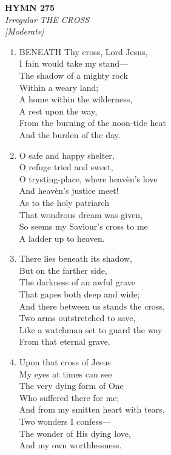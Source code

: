 \newpage
\begin{center}
    {\Large \textbf{HYMN 275}}
    \\
    \textit{Irregular THE CROSS}
    \\
    \textit{\small [Moderate]}
\end{center}
\vspace{1em}

\begin{enumerate}
    \item BENEATH Thy cross, Lord Jesus, \\
        I fain would take my stand--- \\
        The shadow of a mighty rock \\
        Within a weary land; \\
        A home within the wilderness, \\
        A rest upon the way, \\
        From the burning of the noon-tide heat \\
        And the burden of the day.

    \item O safe and happy shelter, \\
        O refuge tried and sweet, \\
        O trysting-place, where heav\`en's love \\
        And heav\`en's justice meet! \\
        As to the holy patriarch \\
        That wondrous dream was given, \\
        So seems my Saviour's cross to me \\
        A ladder up to heaven.

    \item There lies beneath its shadow, \\
        But on the farther side, \\
        The darkness of an awful grave \\
        That gapes both deep and wide; \\
        And there between us stands the cross, \\
        Two arms outstretched to save, \\
        Like a watchman set to guard the way \\
        From that eternal grave.

    \item Upon that cross of Jesus \\
        My eyes at times can see \\
        The very dying form of One \\
        Who suffered there for me; \\
        And from my smitten heart with tears, \\
        Two wonders I confess--- \\
        The wonder of His dying love, \\
        And my own worthlessness.


\end{enumerate}
